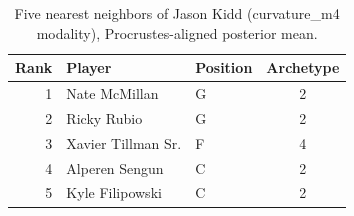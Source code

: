 \begin{table}[htbp]
  \centering\small
  \begin{tabular}{rllc}
    \toprule
    Rank & Player & Position & Archetype \\
    \midrule
    1 & Nate McMillan & G & 2 \\
    2 & Ricky Rubio & G & 2 \\
    3 & Xavier Tillman Sr. & F & 4 \\
    4 & Alperen Sengun & C & 2 \\
    5 & Kyle Filipowski & C & 2 \\
    \bottomrule
  \end{tabular}
  \caption{Five nearest neighbors of Jason Kidd (curvature_m4 modality), Procrustes-aligned posterior mean.}
  \label{tab:Jason_Kidd_neighbors_curvature_m4}
\end{table}

